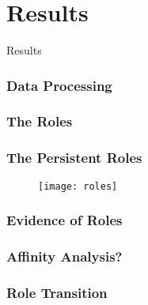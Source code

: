 \section{Results}

\begin{frame}
\begin{center}
     	\huge Results
     \end{center}
\end{frame}

\begin{frame}
\frametitle{Data Processing}

\end{frame}

\begin{frame}
\frametitle{The Roles}
\end{frame}

\begin{frame}
\frametitle{The Persistent Roles}
\begin{figure}
\texttt{[image: roles]}
\end{figure}
\end{frame}

\begin{frame}
\frametitle{Evidence of Roles}

\end{frame}

\begin{frame}
\frametitle{Affinity Analysis?}
\end{frame}

\begin{frame}
\frametitle{Role Transition}
\end{frame}
